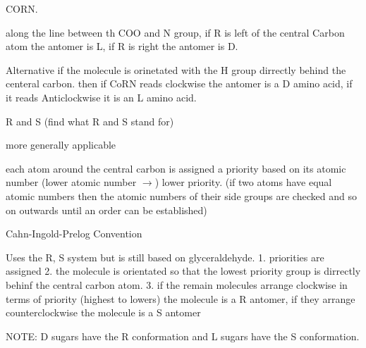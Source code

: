 \documentclass[]{article}
\begin{document}
CORN.

along the line between th COO and N group, if R is left of the central
Carbon atom the antomer is L, if R is right the antomer is D.

Alternative if the molecule is orinetated with the H group dirrectly
behind the centeral carbon. then if CoRN reads clockwise the antomer is
a D amino acid, if it reads Anticlockwise it is an L amino acid.

R and S (find what R and S stand for)

more generally applicable

each atom around the central carbon is assigned a priority based on its
atomic number (lower atomic number \(\rightarrow\)) lower priority. (if
two atoms have equal atomic numbers then the atomic numbers of their
side groups are checked and so on outwards until an order can be
established)

Cahn-Ingold-Prelog Convention

Uses the R, S system but is still based on glyceraldehyde. 1. priorities
are assigned 2. the molecule is orientated so that the lowest priority
group is dirrectly behinf the central carbon atom. 3. if the remain
molecules arrange clockwise in terms of priority (highest to lowers) the
molecule is a R antomer, if they arrange counterclockwise the molecule
is a S antomer

NOTE: D sugars have the R conformation and L sugars have the S
conformation.
\end{document}
